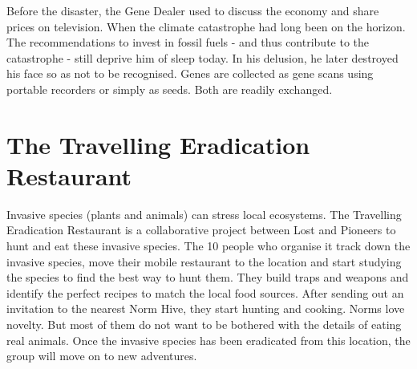 Before the disaster, the Gene Dealer used to discuss the economy and share prices on television. When the climate catastrophe had long been on the horizon. The recommendations to invest in fossil fuels - and thus contribute to the catastrophe - still deprive him of sleep today. In his delusion, he later destroyed his face so as not to be recognised.
Genes are collected as gene scans using portable recorders or simply as seeds. Both are readily exchanged.

\section{The Travelling Eradication Restaurant}
\label{sec:Eradication Restaurant}

Invasive species (plants and animals) can stress local ecosystems. The Travelling Eradication Restaurant is a collaborative project between Lost and Pioneers to hunt and eat these invasive species.
The 10 people who organise it track down the invasive species, move their mobile restaurant to the location and start studying the species to find the best way to hunt them. They build traps and weapons and identify the perfect recipes to match the local food sources.
After sending out an invitation to the nearest Norm Hive, they start hunting and cooking.
Norms love novelty. But most of them do not want to be bothered with the details of eating real animals.
Once the invasive species has been eradicated from this location, the group will move on to new adventures.